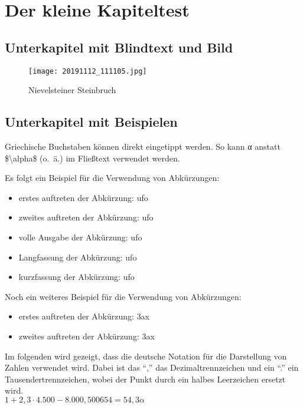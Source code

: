 \chapter{Der kleine Kapiteltest}
	\blindtext

\section{Unterkapitel mit Blindtext und Bild}
	\blindtext
	
	
	\begin{figure}
		\centering
		\texttt{[image: 20191112\_111105.jpg]}  %
		\caption{Nievelsteiner Steinbruch}
		\label{fig:20191112111105}
	\end{figure}


\section{Unterkapitel mit Beispielen}
	Griechische Buchstaben können direkt eingetippt werden. So kann α anstatt \$\textbackslash alpha\$ (o.~ä.) im Fließtext verwendet werden.
	
	Es folgt ein Beispiel für die Verwendung von Abkürzungen:
	\begin{itemize}
		\item erstes auftreten der Abkürzung: \ac{ufo}
		\item zweites auftreten der Abkürzung: \ac{ufo}
		\item volle Ausgabe der Abkürzung: \acf{ufo}
		\item Langfassung der Abkürzung: \acl{ufo}
		\item kurzfassung der Abkürzung: \acs{ufo}
	\end{itemize}
	
	Noch ein weiteres Beispiel für die Verwendung von Abkürzungen:
	\begin{itemize}
		\item erstes auftreten der Abkürzung: \ac{3ax}
		\item zweites auftreten der Abkürzung: \ac{3ax}
	\end{itemize}
	
	Im folgenden wird gezeigt, dass die deutsche Notation für die Darstellung von Zahlen verwendet wird. Dabei ist das ``,'' das Dezimaltrennzeichen und ein ``.'' ein Tausendertrennzeichen, wobei der Punkt durch ein halbes Leerzeichen ersetzt wird.\\
	\begin{math}
		1 + 2,3\cdot 4.500 - 8.000,500654 = 54,3 \alpha
	\end{math}
	
